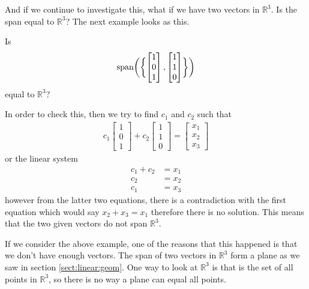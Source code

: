 And if we continue to investigate this, what if we have two vectors in $\mathbb{R}^3$.  Is the span equal to $\mathbb{R}^3$?  The next example looks as this.

\begin{example}
Is
%
\begin{align*}
\operatorname{span}\biggl(\biggl\{ \begin{bmatrix}
1 \\ 0 \\ 1
\end{bmatrix}, \begin{bmatrix}
1 \\ 1 \\ 0
\end{bmatrix} \biggr\} \biggr)
\end{align*}
equal to $\mathbb{R}^3$?


\solution

In order to check this, then we try to find $c_1$ and $c_2$ such that
%
\begin{align*}
c_1 \begin{bmatrix}
1 \\ 0 \\ 1
\end{bmatrix} + c_2 \begin{bmatrix}
1 \\ 1 \\ 0
\end{bmatrix} = \begin{bmatrix}
x_1 \\ x_2 \\ x_3
\end{bmatrix}
\end{align*}
or the linear system
%
\begin{align*}
c_1 + c_2 & = x_1 \\
c_2 & = x_2 \\
c_1 & = x_3
\end{align*}
however from the latter two equations, there is a contradiction with the first equation which would say $x_2+x_3 = x_1$ therefore there is no solution.  This means that the two given vectors do not span $\mathbb{R}^3$.


\end{example}

If we consider the above example, one of the reasons that this happened is that we don't have enough vectors.  The span of two vectors in $\mathbb{R}^3$ form a plane as we saw in section \ref{sect:linear:geom}.  One way to look at $\mathbb{R}^3$ is that is the set of all points in $\mathbb{R}^3$, so there is no way a plane can equal all points.



